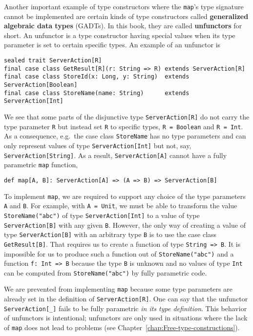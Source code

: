 Another important example of type constructors where the \lstinline!map!'s
type signature cannot be implemented are certain kinds of type constructors
called \textbf{generalized
algebraic data types} (GADTs). In this book, they are
called \textbf{unfunctors} for short. An unfunctor
is a type constructor having special values when its type parameter
is set to certain specific types. An example of an unfunctor is
\begin{lstlisting}
sealed trait ServerAction[R]
final case class GetResult[R](r: String => R) extends ServerAction[R]
final case class StoreId(x: Long, y: String)  extends ServerAction[Boolean]
final case class StoreName(name: String)      extends ServerAction[Int]
\end{lstlisting}
We see that some parts of the disjunctive type \lstinline!ServerAction[R]!
do not carry the type parameter \lstinline!R! but instead set \lstinline!R!
to specific types, \lstinline!R = Boolean! and \lstinline!R = Int!.
As a consequence, e.g.~the case class \lstinline!StoreName! has
no type parameters and can only represent values of type \lstinline!ServerAction[Int]!
but not, say, \lstinline!ServerAction[String]!. As a result, \lstinline!ServerAction[A]!
cannot have a fully parametric \lstinline!map! function, 
\begin{lstlisting}
def map[A, B]: ServerAction[A] => (A => B) => ServerAction[B]
\end{lstlisting}
To implement \lstinline!map!, we are required to support any choice
of the type parameters \lstinline!A! and \lstinline!B!. For example,
with \lstinline!A = Unit!, we must be able to transform the value
\lstinline!StoreName("abc")! of type \lstinline!ServerAction[Int]!
to a value of type \lstinline!ServerAction[B]! with any given \lstinline!B!.
However, the only way of creating a value of type \lstinline!ServerAction[B]!
with an arbitrary type \lstinline!B! is to use the case class \lstinline!GetResult[B]!.
That requires us to create a function of type \lstinline!String => B!.
It is impossible for us to produce such a function out of \lstinline!StoreName("abc")!
and a function \lstinline!f: Int => B! because the type \lstinline!B!
is unknown and no values of type \lstinline!Int! can be computed
from \lstinline!StoreName("abc")! by fully parametric code. 

We are prevented from implementing \lstinline!map! because some type
parameters are already set in the definition of \lstinline!ServerAction[R]!.
One can say that the unfunctor \lstinline!ServerAction[_]! fails
to be fully parametric \emph{in its type definition}. This behavior
of unfunctors is intentional; unfunctors are only used in situations
where the lack of \lstinline!map! does not lead to problems (see
Chapter~\ref{chap:Free-type-constructions}).

